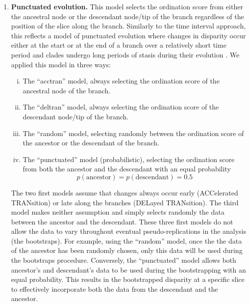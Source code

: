 \documentclass[12pt,a4paper]{article}
\begin{document}


\begin{enumerate}

    \item{\textbf{Punctuated evolution.}} 
    This model selects the ordination score from either the ancestral node or the descendant node/tip of the branch regardless of the position of the slice along the branch. 
    Similarly to the time interval approach, this reflects a model of punctuated evolution where changes in disparity occur either at the start or at the end of a branch over a relatively short time period and clades undergo long periods of stasis during their evolution \citep{Gould1977,Hunt20112007}.
    We applied this model in three ways: 
    \begin{enumerate}[(i)]


      \item The ``acctran'' model, always selecting the ordination score of the ancestral node of the branch.
      \item The ``deltran'' model, always selecting the ordination score of the descendant node/tip of the branch.
      \item The ``random'' model, selecting randomly between the ordination score of the ancestor or the descendant of the branch.
      \item The ``punctuated'' model (probabilistic), selecting the ordination score from both the ancestor and the descendant with an equal probability
          \begin{equation}
          p(\text{ancestor}) = p(\text{descendant}) = 0.5
          \end{equation}

    \end{enumerate}

    The two first models assume that changes always occur early (ACCelerated TRANsition) or late along the branches (DELayed TRANsition).
    The third model makes neither assumption and simply selects randomly the data between the ancestor and the descendant.
    These three first models do not allow the data to vary throughout eventual pseudo-replications in the analysis (the bootstraps).
    For example, using the ``random'' model, once the the data of the ancestor has been randomly chosen, only this data will be used during the bootstraps procedure.
    Conversely, the ``punctuated'' model allows both ancestor's and descendant's data to be used during the bootstrapping with an equal probability.
    This results in the bootstrapped disparity at a specific slice to effectively incorporate both the data from the descendant and the ancestor. %


\end{enumerate}
\end{document}
